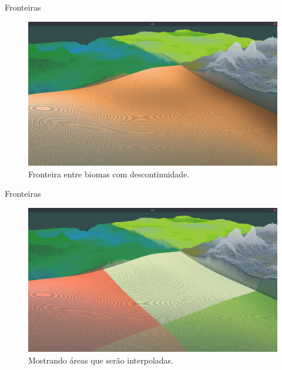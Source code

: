 \begin{frame}{Fronteiras}
    \begin{figure}[H]
        \centering
        \includegraphics[width=.9\textwidth]{img/interpolationarea/notinter.png}
        \caption{Fronteira entre biomas com descontinuidade.}
        \label{fig:img_interpolationarea_notinter}
    \end{figure}
    
\end{frame}

\begin{frame}{Fronteiras}
    \begin{figure}[H]
        \centering
        \includegraphics[width=.9\textwidth]{img/interpolationarea/showareanotinterpo.png}
        \caption{Mostrando áreas que serão interpoladas.}
        \label{img_interpolationarea_showareanotinterpo}
    \end{figure}
    
\end{frame}

